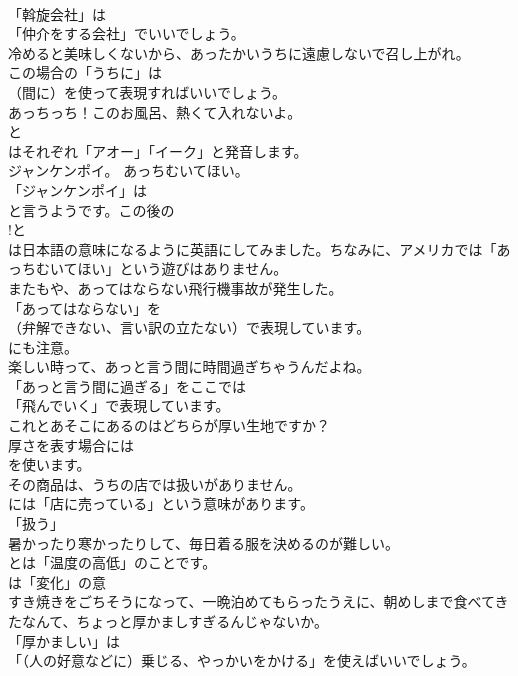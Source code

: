 \documentclass[8pt]{extreport}
\begin{document}
\begin{CJK}{UTF8}{min}
\\	「斡旋会社」は
\\	「仲介をする会社」でいいでしょう。	
\\	冷めると美味しくないから、あったかいうちに遠慮しないで召し上がれ。 
\\	この場合の「うちに」は 
\\	（間に）を使って表現すればいいでしょう。	
\\	あっちっち！このお風呂、熱くて入れないよ。 
\\	と
\\	はそれぞれ「アオー」「イーク」と発音します。	
\\	ジャンケンポイ。 あっちむいてほい。 
\\	「ジャンケンポイ」は
\\	と言うようです。この後の
\\	!と
\\	は日本語の意味になるように英語にしてみました。ちなみに、アメリカでは「あっちむいてほい」という遊びはありません。	
\\	またもや、あってはならない飛行機事故が発生した。 
\\	「あってはならない」を 
\\	（弁解できない、言い訳の立たない）で表現しています。
\\	にも注意。	
\\	楽しい時って、あっと言う間に時間過ぎちゃうんだよね。 
\\	「あっと言う間に過ぎる」をここでは
\\	「飛んでいく」で表現しています。	
\\	これとあそこにあるのはどちらが厚い生地ですか？ 
\\	厚さを表す場合には
\\	を使います。	
\\	その商品は、うちの店では扱いがありません。 
\\	には「店に売っている」という意味があります。
\\	「扱う」	
\\	暑かったり寒かったりして、毎日着る服を決めるのが難しい。 
\\	とは「温度の高低」のことです。
\\	は「変化」の意	
\\	すき焼きをごちそうになって、一晩泊めてもらったうえに、朝めしまで食べてきたなんて、ちょっと厚かましすぎるんじゃないか。 
\\	「厚かましい」は
\\	「（人の好意などに）乗じる、やっかいをかける」を使えばいいでしょう。

\end{CJK}
\end{document}
